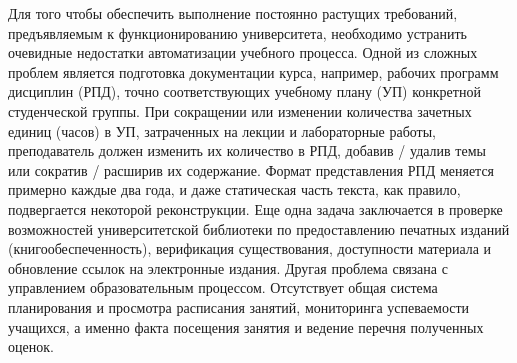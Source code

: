 \documentclass[ 

]{aiitart}
\begin{document}
Для того чтобы обеспечить выполнение постоянно растущих требований, предъявляемым к функционированию университета, необходимо устранить очевидные недостатки автоматизации учебного процесса. Одной из сложных проблем является подготовка документации курса, например, рабочих программ дисциплин (РПД), точно соответствующих учебному плану (УП) конкретной студенческой группы. При сокращении или изменении количества зачетных единиц (часов) в УП, затраченных на лекции и лабораторные работы, преподаватель должен изменить их количество в РПД, добавив / удалив темы или сократив / расширив их содержание. Формат представления РПД меняется примерно каждые два года, и даже статическая часть текста, как правило, подвергается некоторой реконструкции. Еще одна задача заключается в проверке возможностей университетской библиотеки по предоставлению печатных изданий (книгообеспеченность), верификация существования, доступности материала и обновление ссылок на электронные издания. Другая проблема связана с управлением образовательным процессом. Отсутствует общая система планирования и просмотра расписания занятий, мониторинга успеваемости учащихся, а именно факта посещения занятия и ведение перечня полученных оценок. 

\end{document}
